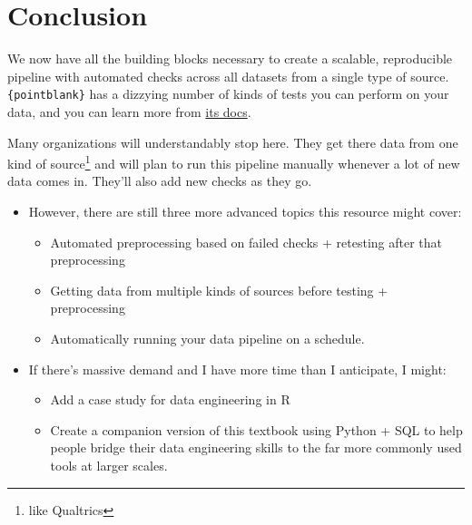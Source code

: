 \documentclass[
  letterpaper,
  DIV=11,
  numbers=noendperiod]{scrreprt}
\providecommand{\tightlist}{%
  \setlength{\itemsep}{0pt}\setlength{\parskip}{0pt}}\usepackage{longtable,booktabs,array}
\begin{document}
\hypertarget{conclusion}{%
\section{Conclusion}\label{conclusion}}

We now have all the building blocks necessary to create a scalable,
reproducible pipeline with automated checks across all datasets from a
single type of source. \texttt{\{pointblank\}} has a dizzying number of
kinds of tests you can perform on your data, and you can learn more from
\href{https://rstudio.github.io/pointblank/index.html}{its docs}.

Many organizations will understandably stop here. They get there data
from one kind of source\footnote{like Qualtrics} and will plan to run
this pipeline manually whenever a lot of new data comes in. They'll also
add new checks as they go.

\begin{itemize}
\tightlist
\item
  However, there are still three more advanced topics this resource
  might cover:

  \begin{itemize}
  \tightlist
  \item
    Automated preprocessing based on failed checks + retesting after
    that preprocessing
  \item
    Getting data from multiple kinds of sources before testing +
    preprocessing
  \item
    Automatically running your data pipeline on a schedule.
  \end{itemize}
\item
  If there's massive demand and I have more time than I anticipate, I
  might:

  \begin{itemize}
  \tightlist
  \item
    Add a case study for data engineering in R
  \item
    Create a companion version of this textbook using Python + SQL to
    help people bridge their data engineering skills to the far more
    commonly used tools at larger scales.
  \end{itemize}
\end{itemize}
\end{document}
